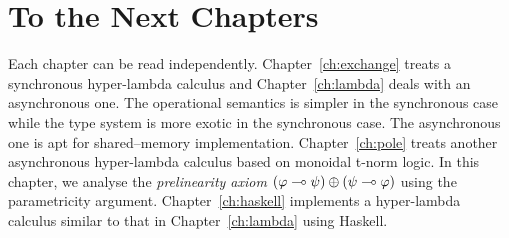 \section{To the Next Chapters}

Each chapter can be read independently.
Chapter~\ref{ch:exchange} treats a synchronous hyper-lambda calculus and
Chapter~\ref{ch:lambda} deals with an asynchronous one.
The operational semantics is simpler in the synchronous case while
the type system is more exotic in the synchronous case.
The asynchronous one is apt for shared--memory implementation.
Chapter~\ref{ch:pole} treats another asynchronous hyper-lambda calculus
based on monoidal t-norm logic.  In this chapter, we analyse the
\textit{prelinearity
axiom}
$(\varphi\multimap\psi)\oplus(\psi\multimap\varphi)$ using the
parametricity argument.
Chapter~\ref{ch:haskell} implements a hyper-lambda calculus similar to
that in Chapter~\ref{ch:lambda} using Haskell.
